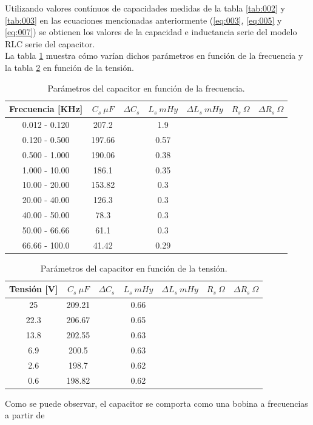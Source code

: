 \documentclass[a4paper,10pt]{article}
\begin{document}
		\indent Utilizando valores contínuos de capacidades medidas de la tabla
		\ref{tab:002} y \ref{tab:003} en las ecuaciones mencionadas anteriormente
		(\ref{eq:003}, \ref{eq:005} y \ref{eq:007}) se obtienen los valores de
		la capacidad e inductancia serie del modelo RLC serie del capacitor. \\
		\indent La tabla \ref{tab:004} muestra cómo varían dichos parámetros en 
		función de la frecuencia y la tabla \ref{tab:005} en función de la 
		tensión.
		
		\begin{table}[!htp]
			\centering
			\begin{tabular}{|c|c|c|c|c|c|c|}
				\hline
				Frecuencia [KHz] & $C_s~\mu F$ & $\Delta C_s$ & 
				$L_s~mHy$  & $\Delta L_s~mHy$  & $R_s~\Omega$ & 
				$\Delta R_s~\Omega$ \\
				\hline
				0.012 - 0.120 &	207.2 &  & 1.9 & \\
				\hline
				0.120 - 0.500 &	197.66 &   & 0.57 & \\
				\hline
				0.500 - 1.000 &	190.06 &   & 0.38 & \\
				\hline
				1.000 - 10.00 &	186.1 &   &	0.35 & \\
				\hline
				10.00 - 20.00 &	153.82 &   & 0.3 & \\
				\hline
				20.00 - 40.00 &	126.3 &   &	0.3 & \\   
				\hline
				40.00 - 50.00 &	78.3 &   & 0.3 & \\
				\hline
				50.00 - 66.66 &	61.1 &   & 0.3 & \\
				\hline
				66.66 - 100.0 &	41.42 &   &	0.29 & \\
				\hline	  
			\end{tabular}
			\caption{Parámetros del capacitor en función de la frecuencia.} 
			\label{tab:004}
		\end{table}	

		\begin{table}[!htp]
			\centering
			\begin{tabular}{|c|c|c|c|c|c|c|}
				\hline
				Tensión [V] & $C_s~\mu F$ & $\Delta C_s$ & 
				$L_s~mHy$  & $\Delta L_s~mHy$  & $R_s~\Omega$ & 
				$\Delta R_s~\Omega$ \\
				\hline
				25 &	209.21 &   & 0.66 & \\
				\hline
				22.3 &	206.67 &   & 0.65 & \\
				\hline
				13.8 &	202.55 &   & 0.63 & \\
				\hline
				6.9 &	200.5 &	  & 0.63 & \\
				\hline
				2.6 &	198.7 &	  & 0.62 & \\
				\hline
				0.6 &	198.82 &   & 0.62 & \\
				\hline	  
			\end{tabular}
			\caption{Parámetros del capacitor en función de la tensión.} 
			\label{tab:005}
		\end{table}	
		\indent Como se puede observar, el capacitor se comporta como una bobina
		a frecuencias a partir de 
\end{document}
